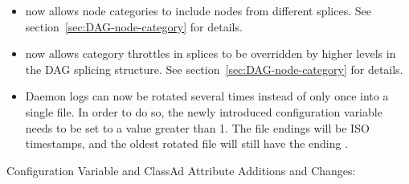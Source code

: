 \begin{itemize}
\item {} now allows node categories to include
nodes from different splices.  See section~\ref{sec:DAG-node-category}
for details.

\item {} now allows category throttles in splices to
be overridden by higher levels in the DAG splicing structure.
See section~\ref{sec:DAG-node-category} for details.

\item Daemon logs can now be rotated several times instead of only once 
  into a single  file. In order to do so, the newly introduced 
  configuration variable  needs to be set 
  to a value greater than 1. The file endings will be ISO timestamps, and
  the oldest rotated file will still have the ending .
 

\end{itemize}

\noindent Configuration Variable and ClassAd Attribute Additions and Changes:

